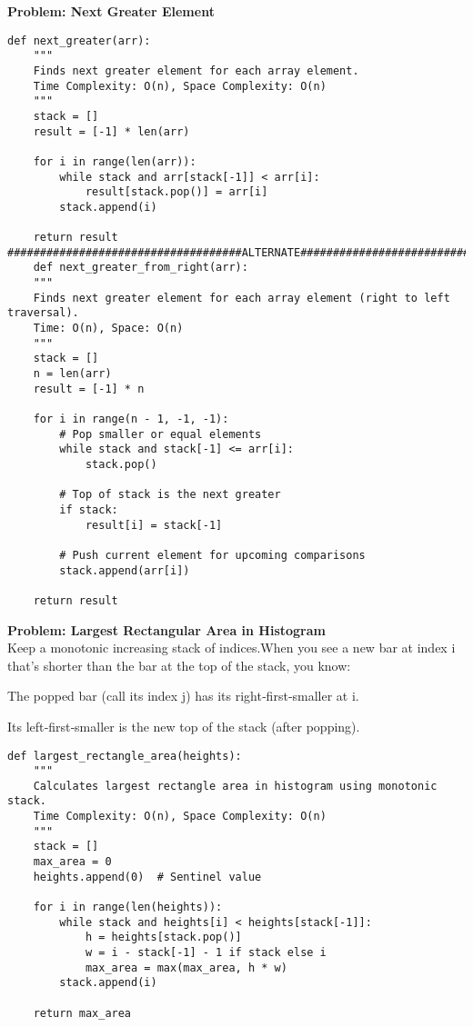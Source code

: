 \noindent\textbf{Problem: Next Greater Element}
\begin{verbatim}
def next_greater(arr):
    """
    Finds next greater element for each array element.
    Time Complexity: O(n), Space Complexity: O(n)
    """
    stack = []
    result = [-1] * len(arr)
    
    for i in range(len(arr)):
        while stack and arr[stack[-1]] < arr[i]:
            result[stack.pop()] = arr[i]
        stack.append(i)
    
    return result
####################################ALTERNATE#####################################
    def next_greater_from_right(arr):
    """
    Finds next greater element for each array element (right to left traversal).
    Time: O(n), Space: O(n)
    """
    stack = []
    n = len(arr)
    result = [-1] * n

    for i in range(n - 1, -1, -1):
        # Pop smaller or equal elements
        while stack and stack[-1] <= arr[i]:
            stack.pop()

        # Top of stack is the next greater
        if stack:
            result[i] = stack[-1]

        # Push current element for upcoming comparisons
        stack.append(arr[i])

    return result

\end{verbatim}

\noindent\textbf{Problem: Largest Rectangular Area in Histogram}\\
Keep a monotonic increasing stack of indices.When you see a new bar at index i that’s shorter than the bar at the top of the stack, you know:

The popped bar (call its index j) has its right‐first‐smaller at i.

Its left‐first‐smaller is the new top of the stack (after popping).
\begin{verbatim}
def largest_rectangle_area(heights):
    """
    Calculates largest rectangle area in histogram using monotonic stack.
    Time Complexity: O(n), Space Complexity: O(n)
    """
    stack = []
    max_area = 0
    heights.append(0)  # Sentinel value
    
    for i in range(len(heights)):
        while stack and heights[i] < heights[stack[-1]]:
            h = heights[stack.pop()]
            w = i - stack[-1] - 1 if stack else i
            max_area = max(max_area, h * w)
        stack.append(i)
    
    return max_area
\end{verbatim}

